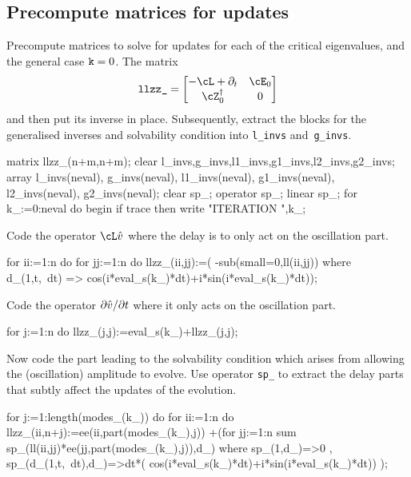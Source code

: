 \documentclass[11pt,a5paper]{article}
\newcommand{\adj}[1]{#1^\dagger} %
\begin{document}
\subsection{Precompute matrices for updates}

Precompute matrices to solve for updates for each of the
critical eigenvalues, and the general case $\verb|k|=0$. The
matrix 
\begin{equation*}
\verb|llzz_| = \begin{bmatrix} -\cL+\partial_t & \cE_0 
\\ \adj\cZ_0 & 0 \end{bmatrix}
\end{equation*}
and then put its inverse in place. Subsequently, extract the
blocks for the generalised inverses and solvability
condition into \verb|l_invs| and~\verb|g_invs|.
\begin{reduce}
matrix llzz_(n+m,n+m);
clear l_invs,g_invs,l1_invs,g1_invs,l2_invs,g2_invs;
array l_invs(neval), g_invs(neval), l1_invs(neval), 
     g1_invs(neval), l2_invs(neval), g2_invs(neval);
clear sp_; operator sp_; linear sp_;
for k_:=0:neval do begin
  if trace then write "ITERATION ",k_; 
\end{reduce}

Code the operator \(\cL\hat v\) where the delay is to only
act on the oscillation part.
\begin{reduce}
  for ii:=1:n do for jj:=1:n do llzz_(ii,jj):=(
      -sub(small=0,ll(ii,jj)) where d_(1,t,~dt)
      => cos(i*eval_s(k_)*dt)+i*sin(i*eval_s(k_)*dt));
\end{reduce}

Code the operator \(\D t{\hat v}\) where it only acts on the
oscillation part.
\begin{reduce}
  for j:=1:n do llzz_(j,j):=eval_s(k_)+llzz_(j,j);
\end{reduce}

Now code the part leading to the solvability condition which
arises from allowing the (oscillation) amplitude to evolve.
Use operator \verb|sp_| to extract the delay parts that
subtly affect the updates of the evolution.
\begin{reduce}
  for j:=1:length(modes_(k_)) do 
    for ii:=1:n do llzz_(ii,n+j):=ee(ii,part(modes_(k_),j))
     +(for jj:=1:n sum 
       sp_(ll(ii,jj)*ee(jj,part(modes_(k_),j)),d_)
       where { sp_(1,d_)=>0
             , sp_(d_(1,t,~dt),d_)=>dt*(
               cos(i*eval_s(k_)*dt)+i*sin(i*eval_s(k_)*dt))
             });
\end{reduce}
\end{document}
